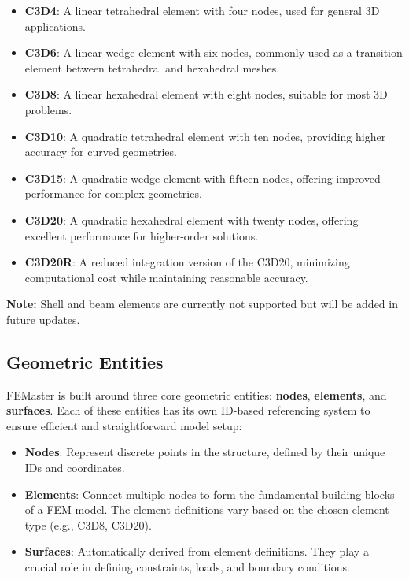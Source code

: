 \begin{itemize}
    \item \textbf{C3D4}: A linear tetrahedral element with four nodes, used for general 3D applications.
    \item \textbf{C3D6}: A linear wedge element with six nodes, commonly used as a transition element between tetrahedral and hexahedral meshes.
    \item \textbf{C3D8}: A linear hexahedral element with eight nodes, suitable for most 3D problems.
    \item \textbf{C3D10}: A quadratic tetrahedral element with ten nodes, providing higher accuracy for curved geometries.
    \item \textbf{C3D15}: A quadratic wedge element with fifteen nodes, offering improved performance for complex geometries.
    \item \textbf{C3D20}: A quadratic hexahedral element with twenty nodes, offering excellent performance for higher-order solutions.
    \item \textbf{C3D20R}: A reduced integration version of the C3D20, minimizing computational cost while maintaining reasonable accuracy.
\end{itemize}

\textbf{Note:} Shell and beam elements are currently not supported but will be added in future updates.

\subsection{Geometric Entities}
\label{sec:geometric_entities}
FEMaster is built around three core geometric entities: \textbf{nodes}, \textbf{elements}, and \textbf{surfaces}. Each of these entities has its own ID-based referencing system to ensure efficient and straightforward model setup:

\begin{itemize}
    \item \textbf{Nodes}: Represent discrete points in the structure, defined by their unique IDs and coordinates.
    \item \textbf{Elements}: Connect multiple nodes to form the fundamental building blocks of a FEM model. The element definitions vary based on the chosen element type (e.g., C3D8, C3D20).
    \item \textbf{Surfaces}: Automatically derived from element definitions. They play a crucial role in defining constraints, loads, and boundary conditions.
\end{itemize}


